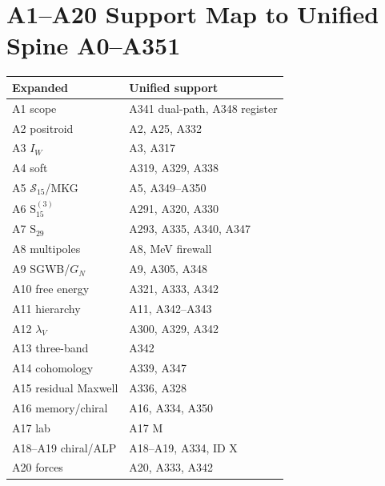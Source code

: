 \documentclass[11pt,a4paper]{article}
\theoremstyle{definition}
\begin{document}
\section*{A1--A20 Support Map to Unified Spine A0--A351}
\begin{center}
\begin{tabular}{@{}ll@{}}
\toprule
Expanded & Unified support \\
\midrule
A1 scope & A341 dual-path, A348 register \\
A2 positroid & A2, A25, A332 \\
A3 $I_W$ & A3, A317 \\
A4 soft & A319, A329, A338 \\
A5 $\mathcal{S}_{15}$/MKG & A5, A349--A350 \\
A6 $\mathrm{S}_{15}^{(3)}$ & A291, A320, A330 \\
A7 $\mathrm{S}_{29}$ & A293, A335, A340, A347 \\
A8 multipoles & A8, MeV firewall \\
A9 SGWB/$G_N$ & A9, A305, A348 \\
A10 free energy & A321, A333, A342 \\
A11 hierarchy & A11, A342--A343 \\
A12 $\lambda_V$ & A300, A329, A342 \\
A13 three-band & A342 \\
A14 cohomology & A339, A347 \\
A15 residual Maxwell & A336, A328 \\
A16 memory/chiral & A16, A334, A350 \\
A17 lab & A17 M \\
A18--A19 chiral/ALP & A18--A19, A334, ID X \\
A20 forces & A20, A333, A342 \\
\bottomrule
\end{tabular}
\end{center}
\end{document}
